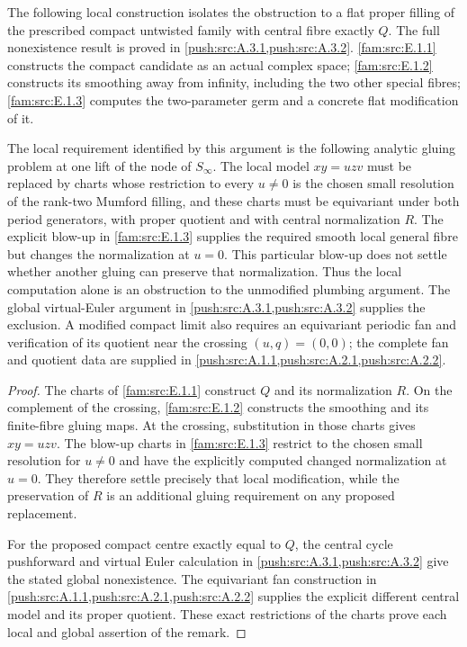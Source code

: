 \begin{remark}\label{fam:src:E.1.5}\label{fam:st:E.1.5}
The following local construction isolates the obstruction to a flat proper filling of the prescribed compact untwisted family with central fibre exactly $Q$. The full nonexistence result is proved in \cref{push:src:A.3.1,push:src:A.3.2}. \ref{fam:src:E.1.1} constructs the compact candidate as an actual complex
space; \ref{fam:src:E.1.2} constructs its smoothing away from infinity, including
the two other special fibres; \ref{fam:src:E.1.3} computes the two-parameter germ and a concrete flat modification of it.

The local requirement identified by this argument is the following analytic gluing
problem at one lift of the node of $S_\infty$. The local model
$xy=uzv$ must be replaced by charts whose restriction to every
$u\ne0$ is the chosen small resolution of the rank-two Mumford
filling, and these charts must be equivariant under both period
generators, with proper quotient and with central normalization $R$.
The explicit blow-up in \ref{fam:src:E.1.3} supplies the required smooth local
general fibre but changes the normalization at $u=0$. This particular blow-up does not settle whether another gluing can preserve that normalization. Thus the local computation alone is an obstruction to the unmodified plumbing argument. The global virtual-Euler argument in \cref{push:src:A.3.1,push:src:A.3.2} supplies the exclusion. A modified compact limit
also requires an equivariant periodic fan and verification of its
quotient near the crossing $(u,q)=(0,0)$; the complete fan and quotient data are supplied in \cref{push:src:A.1.1,push:src:A.2.1,push:src:A.2.2}.
\end{remark}
\begin{proof}

The charts of \ref{fam:src:E.1.1} construct $Q$ and its normalization
$R$. On the complement of the crossing, \ref{fam:src:E.1.2}
constructs the smoothing and its finite-fibre gluing maps.
At the crossing, substitution in those charts gives $xy=uzv$.
The blow-up charts in \ref{fam:src:E.1.3} restrict to the chosen
small resolution for $u\ne0$ and have the explicitly computed
changed normalization at $u=0$. They therefore settle precisely
that local modification, while the preservation of $R$ is an
additional gluing requirement on any proposed replacement.

For the proposed compact centre exactly equal to $Q$, the central
cycle pushforward and virtual Euler calculation in
\ref{push:src:A.3.1,push:src:A.3.2} give the stated global
nonexistence. The equivariant fan construction in
\ref{push:src:A.1.1,push:src:A.2.1,push:src:A.2.2}
supplies the explicit different central model and its proper
quotient. These exact restrictions of the charts prove each
local and global assertion of the remark.

\end{proof}
